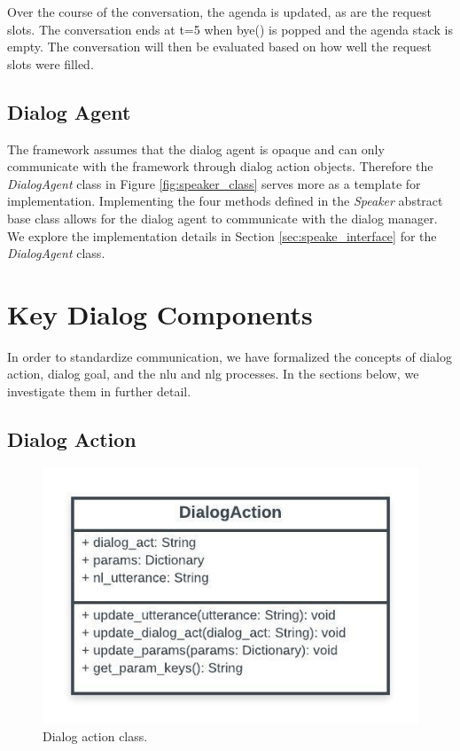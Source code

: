 Over the course of the conversation, the agenda is updated, as are the request slots. The conversation ends at t=5 when bye() is popped and the agenda stack is empty. The conversation will then be evaluated based on how well the request slots were filled.

\subsection{Dialog Agent}
The framework assumes that the dialog agent is opaque and can only communicate with the framework through dialog action objects. Therefore the \textit{DialogAgent} class in Figure \ref{fig:speaker_class} serves more as a template for implementation. Implementing the four methods defined in the \textit{Speaker} abstract base class allows for the dialog agent to communicate with the dialog manager. We explore the implementation details in Section \ref{sec:speake_interface} for the \textit{DialogAgent} class.

\section{Key Dialog Components}
In order to standardize communication, we have formalized the concepts of dialog action, dialog goal, and the nlu and nlg processes. In the sections below, we investigate them in further detail.

\subsection{Dialog Action}
\label{sssec:dialog_action}

\begin{figure}[h!]
	\centering
	\includegraphics[scale=1]{diagrams/dialog_action.jpeg}
	\caption{ Dialog action class. }
	\label{fig:dialog_action_class}
\end{figure}

